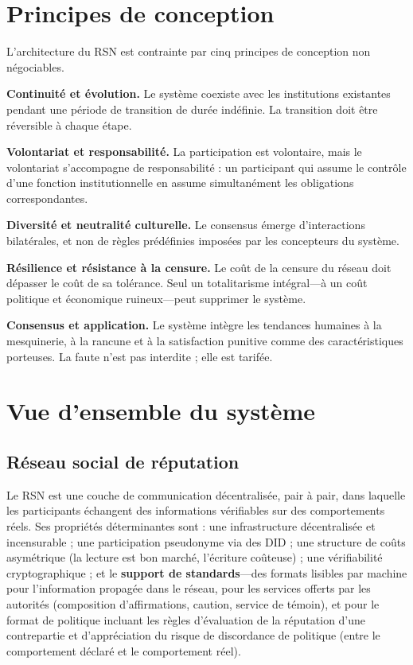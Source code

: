 \documentclass[11pt,a4paper,twocolumn]{article}
\begin{document}
\section{Principes de conception}

L'architecture du RSN est contrainte par cinq principes de conception non négociables.

\textbf{Continuité et évolution.} Le système coexiste avec les institutions existantes pendant une période de transition de durée indéfinie. La transition doit être réversible à chaque étape.

\textbf{Volontariat et responsabilité.} La participation est volontaire, mais le volontariat s'accompagne de responsabilité : un participant qui assume le contrôle d'une fonction institutionnelle en assume simultanément les obligations correspondantes.

\textbf{Diversité et neutralité culturelle.} Le consensus émerge d'interactions bilatérales, et non de règles prédéfinies imposées par les concepteurs du système.

\textbf{Résilience et résistance à la censure.} Le coût de la censure du réseau doit dépasser le coût de sa tolérance. Seul un totalitarisme intégral---à un coût politique et économique ruineux---peut supprimer le système.

\textbf{Consensus et application.} Le système intègre les tendances humaines à la mesquinerie, à la rancune et à la satisfaction punitive comme des caractéristiques porteuses. La faute n'est pas interdite ; elle est tarifée.

\section{Vue d'ensemble du système}

\subsection{Réseau social de réputation}

Le RSN est une couche de communication décentralisée, pair à pair, dans laquelle les participants échangent des informations vérifiables sur des comportements réels. Ses propriétés déterminantes sont : une infrastructure décentralisée et incensurable ; une participation pseudonyme via des DID ; une structure de coûts asymétrique (la lecture est bon marché, l'écriture coûteuse) ; une vérifiabilité cryptographique ; et le \textbf{support de standards}---des formats lisibles par machine pour l'information propagée dans le réseau, pour les services offerts par les autorités (composition d'affirmations, caution, service de témoin), et pour le format de politique incluant les règles d'évaluation de la réputation d'une contrepartie et d'appréciation du risque de discordance de politique (entre le comportement déclaré et le comportement réel).
\end{document}
